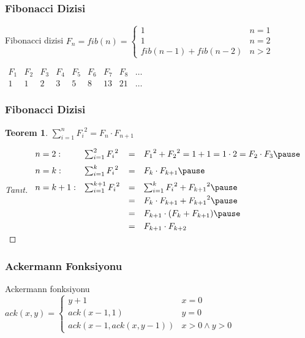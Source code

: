 \documentclass[dvipsnames]{beamer}
\theoremstyle{definition}
\theoremstyle{example}
\theoremstyle{plain}
\newtheorem{teorem}[theorem]{Teorem}
\begin{document}
\begin{frame}
  \frametitle{Fibonacci Dizisi}

  \begin{block}{Fibonacci dizisi}
    $F_n = fib(n) = \left\{
      \begin{array}{ll}
        1                   & n = 1\\
        1                   & n = 2\\
        fib(n-1) + fib(n-2) & n > 2
      \end{array}
    \right.$
  \end{block}

  \bigskip
  $\begin{array}{ccccccccc}
     F_1 & F_2 & F_3 & F_4 & F_5 & F_6 & F_7 & F_8 & \dots\\
     1   & 1   & 2   & 3   & 5   & 8   & 13  & 21  & \dots
  \end{array}$
\end{frame}

\begin{frame}
  \frametitle{Fibonacci Dizisi}

  \begin{teorem}
    $\sum_{i=1}^{n} {F_i}^2 = F_n \cdot F_{n+1}$
  \end{teorem}

  \pause
  \begin{proof}[Tanıt]
    $\begin{array}{llcl}
      n=2:   & \sum_{i=1}^{2} {F_i}^2   & = & {F_1}^2+{F_2}^2=1+1=1 \cdot 2=F_2 \cdot F_3
      \pause
      \medskip\\
      n=k:   & \sum_{i=1}^{k} {F_i}^2   & = & F_k \cdot F_{k+1}
      \pause
      \medskip\\
      n=k+1: & \sum_{i=1}^{k+1} {F_i}^2 & = & \sum_{i=1}^{k} {F_i}^2 + {F_{k+1}}^2
      \pause
      \smallskip\\
             &                          & = & F_k \cdot F_{k+1} + {F_{k+1}}^2
      \pause
      \smallskip\\
             &                          & = & F_{k+1} \cdot (F_k + F_{k+1})
      \pause
      \smallskip\\
             &                          & = & F_{k+1} \cdot F_{k+2}
    \end{array}$
  \end{proof}
\end{frame}

\begin{frame}
  \frametitle{Ackermann Fonksiyonu}

  \begin{block}{Ackermann fonksiyonu}
    $ack(x,y) = \left\{
      \begin{array}{ll}
        y+1                 & x = 0\\
        ack(x-1, 1)         & y = 0\\
        ack(x-1,ack(x,y-1)) & x > 0 \wedge y > 0
      \end{array}
    \right.$
  \end{block}
\end{frame}
\end{document}
